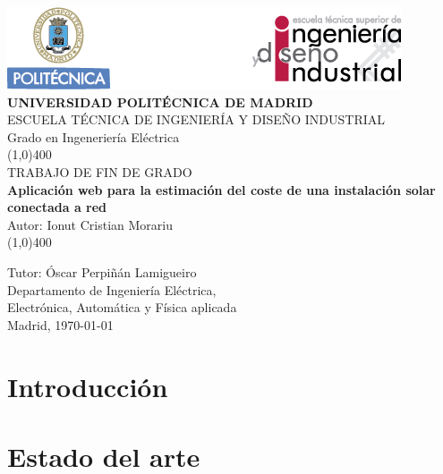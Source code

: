 \documentclass[11pt]{report}
\begin{document}
\begin{titlepage}



\begin{center}
	\includegraphics[scale=1]{cabecera}\\
	\vspace*{1cm}
	\Large{\textbf{\MakeUppercase{Universidad Politécnica de Madrid}}}\\[3mm]
	\Large{{\MakeUppercase{Escuela técnica de ingeniería y diseño industrial}}}\\[3mm]
	\Large {Grado en Ingeneriería Eléctrica}\\
	\vfill
	\line(1,0){400}\\
	\Large{{\MakeUppercase{Trabajo de fin de grado}}}\\
	\Huge{\textbf{Aplicación web para la estimación del coste de una instalación solar conectada a red}}\\[5mm]
	\Large{Autor: Ionut Cristian Morariu}\\
	\line(1,0){400}\\
	\vfill
\end{center}
\begin{flushright}
\Large {Tutor: Óscar Perpiñán Lamigueiro}\\[3mm]
\Large{Departamento de Ingeniería Eléctrica,\\ Electrónica, Automática y Física aplicada}\\[10mm]
Madrid, \today
\end{flushright}

\end{titlepage}

\renewcommand{\baselinestretch}{1.5} %
\renewcommand{\labelitemi}{\textbullet}

\tableofcontents
\thispagestyle{empty}
\clearpage

\setcounter{page}{1}


\chapter{Introducción}


\chapter{Estado del arte}

\end{document}
